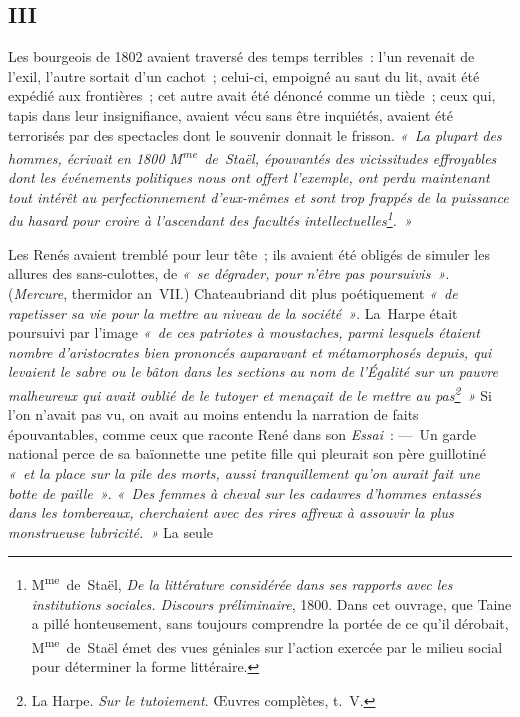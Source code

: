 \documentclass[french,twoside]{book} %
\begin{document}
\label{p586}\subsection[{III}]{III}
\noindent Les bourgeois de 1802 avaient traversé des temps terribles : l’un revenait de l’exil, l’autre sortait d’un cachot ; celui-ci, empoigné au saut du lit, avait été expédié aux frontières ; cet autre avait été dénoncé comme un tiède ; ceux qui, tapis dans leur insignifiance, avaient vécu sans être inquiétés, avaient été terrorisés par des spectacles dont le souvenir donnait le frisson. \emph{« La plupart des hommes, écrivait en 1800 M\textsuperscript{me} de Staël, épouvantés des vicissitudes effroyables dont les événements politiques nous ont offert l’exemple, ont perdu maintenant tout intérêt au perfectionnement d’eux-mêmes et sont trop frappés de la puissance du hasard pour croire à l’ascendant des facultés intellectuelles\footnote{M\textsuperscript{me} de Staël, \emph{De la littérature considérée dans ses rapports avec les institutions sociales. Discours préliminaire}, 1800. Dans cet ouvrage, que Taine a pillé honteusement, sans toujours comprendre la portée de ce qu’il dérobait, M\textsuperscript{me} de Staël émet des vues géniales sur l’action exercée par le milieu social pour déterminer la forme littéraire.}. »}\par
Les Renés avaient tremblé pour leur tête ; ils avaient été obligés de simuler les allures des sans-culottes, de \emph{« se dégrader, pour n’être pas poursuivis »}. (\emph{Mercure}, thermidor an VII.) Chateaubriand dit plus poétiquement \emph{« de rapetisser sa vie pour la mettre au niveau de la société »}. La Harpe était poursuivi par l’image \emph{« de ces {\itshape patriotes à moustaches}, parmi lesquels étaient nombre d’aristocrates bien prononcés auparavant et métamorphosés depuis, qui levaient le sabre ou le bâton dans les sections au nom de l’{\itshape Égalité} sur un pauvre malheureux qui avait oublié de le tutoyer et menaçait de le mettre au pas\footnote{La Harpe. \emph{Sur le tutoiement}. Œuvres complètes, t. V.} »} Si l’on n’avait pas vu, on avait au moins entendu la narration de faits épouvantables, comme ceux que raconte René dans son \emph{Essai} : — Un garde national perce de sa baïonnette une petite fille qui pleurait son père guillotiné \emph{« et la place sur la pile des morts, aussi tranquillement qu’on aurait fait une botte de paille »}. \emph{« Des femmes à cheval sur les cadavres d’hommes entassés dans les tombereaux, cherchaient avec des rires affreux à assouvir la plus monstrueuse lubricité. »} La seule  
\end{document}
